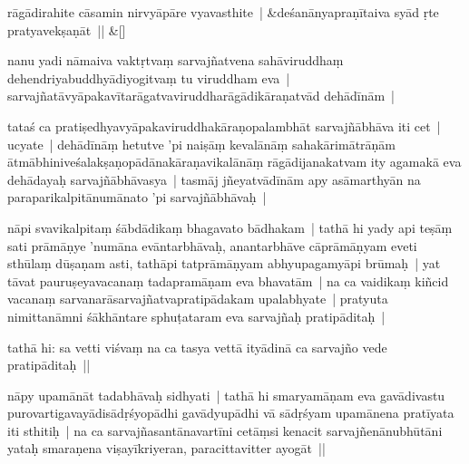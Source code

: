 \documentclass[article,12pt,a4paper]{memoir}%
\newcounter{parCount}
\begin{document}
	    
	    \stanza[\smallbreak]
	  rāgādirahite cāsamin nirvyāpāre vyavasthite | &deśanānyapraṇītaiva syād ṛte pratyavekṣaṇāt || \&[\smallbreak]
	  
	  
	  

	  \pstart \leavevmode%
	\label{thakur75-27.13}nanu yadi nāmaiva vaktṛtvaṃ sarvajñatvena sahāviruddhaṃ dehendriyabuddhyādiyogitvaṃ tu viruddham eva | sarvajñatāvyāpakavītarāgatvaviruddharāgādikāraṇatvād dehādīnām | 
	{}
	\pend%
      

	  \pstart \leavevmode%
	\label{thakur75-27.15}tataś ca pratiṣedhyavyāpakaviruddhakāraṇopalambhāt sarvajñābhāva iti cet | ucyate | dehādīnāṃ hetutve 'pi naiṣāṃ kevalānāṃ sahakārimātrāṇām ātmābhiniveśalakṣaṇopādānakāraṇavikalānāṃ rāgādijanakatvam ity agamakā eva dehādayaḥ sarvajñābhāvasya | tasmāj jñeyatvādīnām apy asāmarthyān na paraparikalpitānumānato 'pi sarvajñābhāvaḥ | 
	{}
	\pend%
      

	  \pstart \leavevmode%
	\label{thakur75-27.20}nāpi svavikalpitaṃ śābdādikaṃ bhagavato bādhakam | tathā hi yady api teṣāṃ sati prāmāṇye 'numāna evāntarbhāvaḥ, anantarbhāve cāprāmāṇyam eveti sthūlaṃ dūṣaṇam asti, tathāpi tatprāmāṇyam abhyupagamyāpi brūmaḥ | yat tāvat pauruṣeyavacanaṃ tadapramāṇam eva bhavatām | na ca vaidikaṃ kiñcid vacanaṃ sarvanarāsarvajñatvapratipādakam upalabhyate | pratyuta nimittanāmni śākhāntare sphuṭataram eva sarvajñaḥ pratipāditaḥ | 
	{}
	\pend%
      

	  \pstart \leavevmode%
	tathā hi: sa vetti viśvaṃ na ca tasya vettā ityādinā ca sarvajño vede pratipāditaḥ || 
	{}
	\pend%
      

	  \pstart \leavevmode%
	nāpy upamānāt tadabhāvaḥ sidhyati | tathā hi smaryamāṇam eva gavādivastu purovartigavayādisādṛśyopādhi gavādyupādhi vā sādṛśyam upamānena pratīyata iti sthitiḥ | na ca sarvajñasantānavartīni cetāṃsi kenacit sarvajñenānubhūtāni yataḥ smaraṇena viṣayīkriyeran, paracittavitter ayogāt || 
	{}
	\pend%
      
\end{document}
